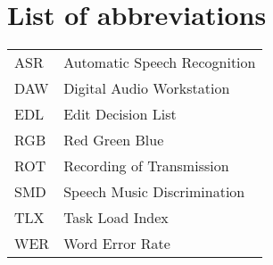 \chapter*{List of abbreviations}

\begin{tabular}{l l}
ASR & Automatic Speech Recognition \\
DAW & Digital Audio Workstation \\
EDL & Edit Decision List \\
RGB & Red Green Blue \\
ROT & Recording of Transmission \\
SMD & Speech Music Discrimination \\
TLX & Task Load Index \\
WER & Word Error Rate
\end{tabular}
